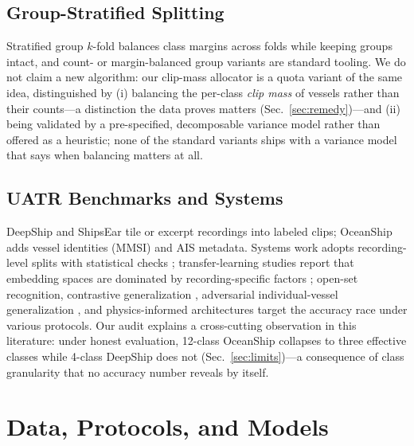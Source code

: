 ﻿\documentclass[journal]{IEEEtran}
\begin{document}
\subsection{Group-Stratified Splitting}
Stratified group $k$-fold \cite{sklearn} balances class margins across folds while keeping groups
intact, and count- or margin-balanced group variants are standard tooling. We do not claim a new
algorithm: our clip-mass allocator is a quota variant of the same idea, distinguished by (i)
balancing the per-class \emph{clip mass} of vessels rather than their counts---a distinction the
data proves matters (Sec.~\ref{sec:remedy})---and (ii) being validated by a pre-specified,
decomposable variance model rather than offered as a heuristic; none of the standard variants
ships with a variance model that says when balancing matters at all.

\subsection{UATR Benchmarks and Systems}
DeepShip \cite{deepship} and ShipsEar \cite{shipsear} tile or excerpt recordings into labeled
clips; OceanShip \cite{oceanship} adds vessel identities (MMSI) and AIS metadata. Systems work
adopts recording-level splits with statistical checks \cite{boosting2026}; transfer-learning
studies report that embedding spaces are dominated by recording-specific factors
\cite{hummel2026}; open-set recognition, contrastive generalization \cite{aa2025contrastive},
adversarial individual-vessel generalization \cite{fang2025}, and physics-informed architectures
\cite{mmipfnn2026} target the accuracy race under various protocols.
Our audit explains a cross-cutting observation in this literature: under honest evaluation,
12-class OceanShip collapses to three effective classes while 4-class DeepShip does not
(Sec.~\ref{sec:limits})---a consequence of class granularity that no accuracy number reveals by
itself.

\section{Data, Protocols, and Models}
\label{sec:setup}
\end{document}
